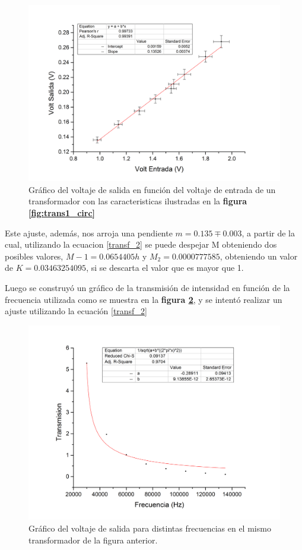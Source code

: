 \documentclass[11pt,a4paper]{article}
\begin{document}
\begin{figure}[H]
	\centering
	\includegraphics[scale=0.4]{Transformador1_Vent_vs_Vsal}
	\caption{Gráfico del voltaje de salida en función del voltaje de entrada de un transformador con las caracteristicas ilustradas en la \textbf{figura \ref{fig:trans1_circ}} }
	\label{fig:Tr1-Recta}
\end{figure}

Este ajuste, además, nos arroja una pendiente $m= 0.135 \mp 0.003$, a partir de la cual, utilizando la ecuacion \eqref{transf_2} se puede despejar M obteniendo dos posibles valores, $M-{1} = 0.0654405 h$ y $M_{2} = 0.0000777585$, obteniendo un valor de $K = 0.03463254095$, si se descarta el valor que es mayor que 1.

Luego se construyó un gráfico de la transmisión de intensidad en función de la frecuencia utilizada como se muestra en la \textbf{figura \ref{fig:Tr1-Hip}}, y se intentó realizar un ajuste utilizando la ecuación \ref{transf_2}

\begin{figure}[H]
	\centering
	\includegraphics[scale=0.4]{Transmision_vs_Frecuencia_choto}
	\caption{Gráfico del voltaje de salida  para distintas frecuencias en el mismo transformador de la figura anterior.}
	\label{fig:Tr1-Hip}
\end{figure}
\end{document}
